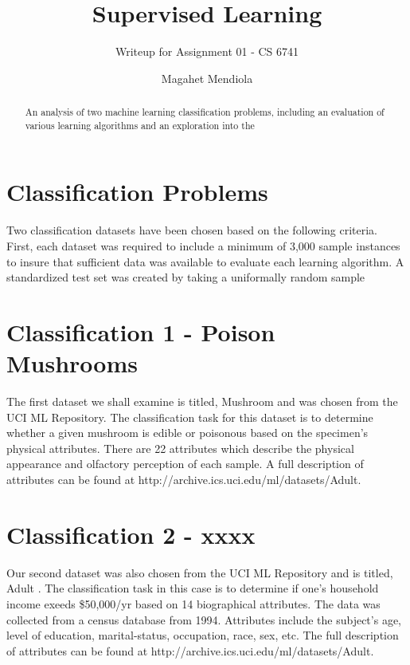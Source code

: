 \documentclass{acm_proc_article-sp}
\begin{document}
\title{Supervised Learning}
\subtitle{Writeup for Assignment 01 - CS 6741}

\author{
\alignauthor
Magahet Mendiola
}
\date{}

\maketitle
\begin{abstract}
An analysis of two machine learning classification problems, including an evaluation of various learning algorithms and an exploration into the 
\end{abstract}
 


\section{Classification Problems}

Two classification datasets have been chosen based on the following criteria. First, each dataset was required to include a minimum of 3,000 sample instances to insure that sufficient data was available to evaluate each learning algorithm. A standardized test set was created by taking a uniformally random sample

\section{Classification 1 - Poison Mushrooms}

The first dataset we shall examine is titled, Mushroom \cite{Bache+Lichman:2013} and was chosen from the UCI ML Repository. The classification task for this dataset is to determine whether a given mushroom is edible or poisonous based on the specimen's physical attributes. There are 22 attributes which describe the physical appearance and olfactory perception of each sample. A full description of attributes can be found at http://archive.ics.uci.edu/ml/datasets/Adult.


\section{Classification 2 - xxxx}

Our second dataset was also chosen from the UCI ML Repository and is titled, Adult \cite{Bache+Lichman:2013}. The classification task in this case is to determine if one's household income exeeds \$50,000/yr based on 14 biographical attributes. The data was collected from a census database from 1994. Attributes include the subject's age, level of education, marital-status, occupation, race, sex, etc. The full description of attributes can be found at http://archive.ics.uci.edu/ml/datasets/Adult.
\end{document}
